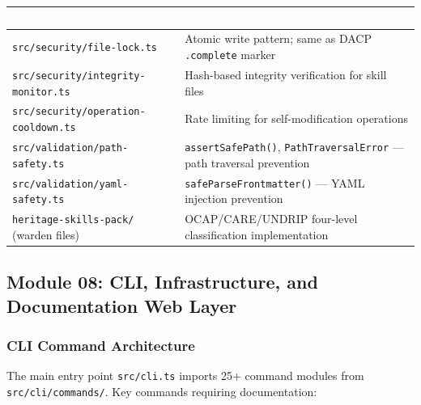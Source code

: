 \documentclass[11pt,letterpaper]{article}
\newcommand{\tableheader}[1]{\textbf{\sffamily\textcolor{white}{#1}}}
\begin{document}
\begin{center}
\begin{tabularx}{\textwidth}{L{5cm}X}
\toprule
{}
\tableheader{File} & \tableheader{Safety Annotation Target} \\
\midrule
\texttt{src/security/file-lock.ts} & Atomic write pattern; same as DACP \texttt{.complete} marker \\
\texttt{src/security/integrity-monitor.ts} & Hash-based integrity verification for skill files \\
\texttt{src/security/operation-cooldown.ts} & Rate limiting for self-modification operations \\
\texttt{src/validation/path-safety.ts} & \texttt{assertSafePath()}, \texttt{PathTraversalError} --- path traversal prevention \\
\texttt{src/validation/yaml-safety.ts} & \texttt{safeParseFrontmatter()} --- YAML injection prevention \\
\texttt{heritage-skills-pack/} (warden files) & OCAP/CARE/UNDRIP four-level classification implementation \\
\bottomrule
\end{tabularx}
\end{center}

\subsection{Module 08: CLI, Infrastructure, and Documentation Web Layer}

\subsubsection{CLI Command Architecture}

The main entry point \texttt{src/cli.ts} imports 25+ command modules from \texttt{src/cli/commands/}. Key commands requiring documentation:
\end{document}
